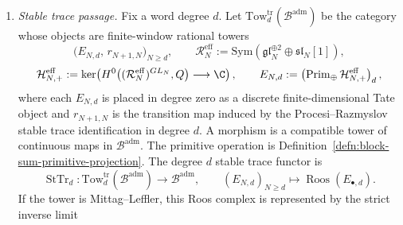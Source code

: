 \begin{defn}
\begin{enumerate}[label=\textup{(A\arabic*)}]
      In the Dirac-brane trace construction, Hamiltonian scalar
      reduction is not an application of \(U_{\mathrm{sc}}\) to either
      the algebra unit or the class \(\operatorname{Tr}\psi\).  It is the
      replacement
      \[
        C^\bullet_{\mathrm{CE}}\!\left(\mathfrak{gl}_N,
          \mathrm{Sym}(\mathfrak{gl}_N^{\oplus2}
          \oplus\mathfrak{gl}_N[1])\right)
        \longmapsto
        C^\bullet_{\mathrm{CE}}\!\left(\mathfrak{pgl}_N,
          \mathrm{Sym}(\mathfrak{gl}_N^{\oplus2}
          \oplus\mathfrak{sl}_N[1])\right).
      \]
      The empty trace is then omitted from the primitive generator
      space before a new algebra unit is adjoined by the completed
      symmetric-algebra functor.  The equation \(K=0\) for the
      projective central extension is a separate central reduction; it
      neither produces the effective \(\mathfrak{pgl}_N/\mathfrak{sl}_N\)
      Koszul model nor removes the empty trace.
    \item\label{adm:stable-trace-passage-functor}
      \emph{Stable trace passage.}  Fix a word degree \(d\).  Let
      \(\mathrm{Tow}^{\mathrm{tr}}_d(\mathcal B^{\mathrm{adm}})\) be the
      category whose objects are finite-window rational towers
      \[
        \bigl(E_{N,d},\,r_{N+1,N}\bigr)_{N\geq d},
        \qquad
        \mathcal R_N^{\mathrm{eff}}
        :=
        \mathrm{Sym}(\mathfrak{gl}_N^{\oplus2}
          \oplus\mathfrak{sl}_N[1]),
      \]
      \[
        \mathcal H_{N,+}^{\mathrm{eff}}
        :=
        \ker\!\left(
          H^0\bigl((\mathcal R_N^{\mathrm{eff}})^{GL_N},Q\bigr)
          \longrightarrow\C\right),
        \qquad
        E_{N,d}:=
        \left(\operatorname{Prim}_{\oplus}
          \mathcal H_{N,+}^{\mathrm{eff}}\right)_d,
      \]
      where each \(E_{N,d}\) is placed in degree zero as a discrete
      finite-dimensional Tate object and \(r_{N+1,N}\) is the
      transition map induced by the Procesi--Razmyslov stable trace
      identification in degree \(d\).  A morphism is a compatible tower
      of continuous maps in \(\mathcal B^{\mathrm{adm}}\).  The
      primitive operation is
      Definition~\ref{defn:block-sum-primitive-projection}.  The degree
      \(d\) stable trace functor is
      \[
        \operatorname{StTr}_d\colon
        \mathrm{Tow}^{\mathrm{tr}}_d(\mathcal B^{\mathrm{adm}})
        \longrightarrow
        \mathcal B^{\mathrm{adm}},
        \qquad
        (E_{N,d})_{N\ge d}\longmapsto
        \operatorname{Roos}(E_{\bullet,d}).
      \]
      If the tower is Mittag--Leffler, this Roos complex is represented
      by the strict inverse limit

\end{enumerate}
\end{defn}

